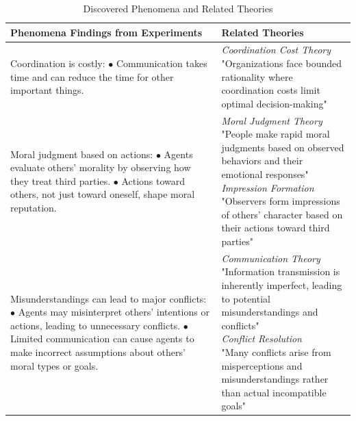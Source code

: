 \begin{table}[ht]
\caption{Discovered Phenomena and Related Theories}
\label{tab:project_findings}
\setlength{\tabcolsep}{4pt}
\begin{tabular}{p{8.5cm}p{8.5cm}}
\hline
\textbf{Phenomena Findings from Experiments} & \textbf{Related Theories} \\
\hline
\parbox[t]{8.5cm}{Coordination is costly: \\ 
\hspace*{1em} $\bullet$ Communication takes time and can reduce the time for other important things.} & 
\parbox[t]{8.5cm}{\textit{Coordination Cost Theory} \citep{simon1991bounded} \\
"Organizations face bounded rationality where coordination costs limit optimal decision-making"} \\
\hline
\parbox[t]{8.5cm}{Moral judgment based on actions: \\
\hspace*{1em} $\bullet$ Agents evaluate others' morality by observing how they treat third parties. \\
\hspace*{1em} $\bullet$ Actions toward others, not just toward oneself, shape moral reputation.} & 
\parbox[t]{8.5cm}{\textit{Moral Judgment Theory} \citep{haidt2001emotional} \\
"People make rapid moral judgments based on observed behaviors and their emotional responses" \\
\textit{Impression Formation} \citep{asch1946forming} \\
"Observers form impressions of others' character based on their actions toward third parties"} \\
\hline

\parbox[t]{8.5cm}{Misunderstandings can lead to major conflicts: \\
\hspace*{1em} $\bullet$ Agents may misinterpret others' intentions or actions, leading to unnecessary conflicts. \\
\hspace*{1em} $\bullet$ Limited communication can cause agents to make incorrect assumptions about others' moral types or goals.} & 
\parbox[t]{8.5cm}{\textit{Communication Theory} \citep{shannon1948mathematical} \\
"Information transmission is inherently imperfect, leading to potential misunderstandings and conflicts" \\
\textit{Conflict Resolution} \citep{deutsch1973resolution} \\
"Many conflicts arise from misperceptions and misunderstandings rather than actual incompatible goals"} \\
\hline


\end{tabular}
\end{table}
